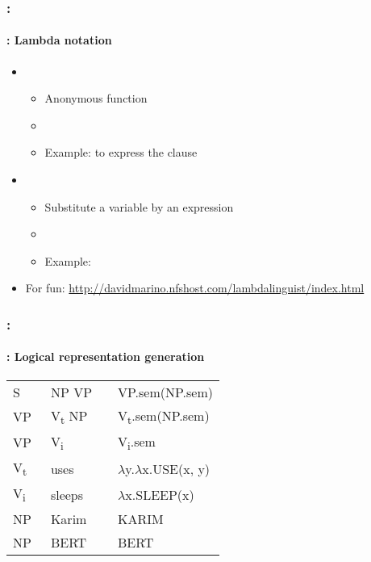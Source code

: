 \documentclass[xcolor=table]{beamer}
\begin{document}
\begin{frame}
	\frametitle{\insertshortsubtitle: \insertsection}
	\framesubtitle{\insertsubsection: Lambda notation}
	
	\begin{itemize}
		\item {}
		\begin{itemize}
			\item Anonymous function
			\item {}
			\item Example:  to express the clause 
		\end{itemize}
		
		\item {}
		\begin{itemize}
			\item Substitute a variable by an expression
			\item \keyword{$ \phi (\psi) $}
			\item Example: 
		\end{itemize}
		
		\item For fun: \url{http://davidmarino.nfshost.com/lambdalinguist/index.html}
	\end{itemize}
	
\end{frame}

\begin{frame}
	\frametitle{\insertshortsubtitle: \insertsection}
	\framesubtitle{\insertsubsection: Logical representation generation}
	
	\begin{center}
		\small
		\begin{tabular}{llll}
			\hline\hline
			S  & \textrightarrow\ NP VP && VP.sem(NP.sem) \\
			VP & \textrightarrow\ V\textsubscript{t} NP && V\textsubscript{t}.sem(NP.sem)\\
			VP & \textrightarrow\ V\textsubscript{i} && V\textsubscript{i}.sem \\
			V\textsubscript{t}  & \textrightarrow\ uses && $ \lambda $y.$ \lambda $x.USE(x, y) \\
			V\textsubscript{i}  & \textrightarrow\ sleeps && $ \lambda $x.SLEEP(x) \\
			NP  & \textrightarrow\  Karim && KARIM \\
			NP  & \textrightarrow\  BERT && BERT \\
			\hline\hline
		\end{tabular}
		
	\end{center}
\end{frame}
\end{document}
